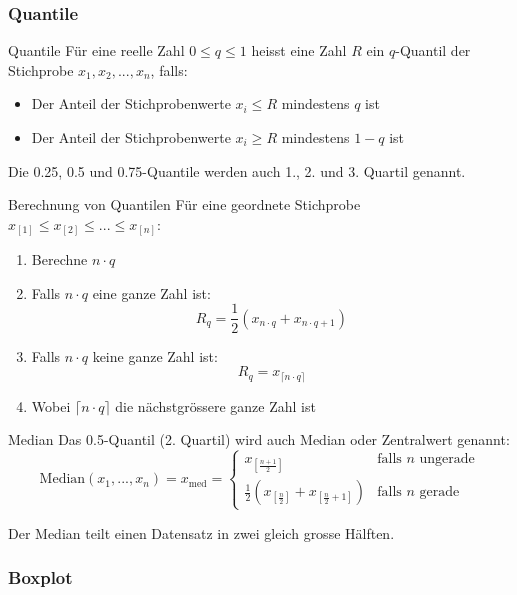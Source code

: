 \subsubsection{Quantile}

\begin{definition}{Quantile}
Für eine reelle Zahl $0 \leq q \leq 1$ heisst eine Zahl $R$ ein $q$-Quantil der Stichprobe $x_1, x_2, ..., x_n$, falls:
\begin{itemize}
    \item Der Anteil der Stichprobenwerte $x_i \leq R$ mindestens $q$ ist
    \item Der Anteil der Stichprobenwerte $x_i \geq R$ mindestens $1-q$ ist
\end{itemize}

Die 0.25, 0.5 und 0.75-Quantile werden auch 1., 2. und 3. Quartil genannt.
\end{definition}

\begin{KR}{Berechnung von Quantilen}
Für eine geordnete Stichprobe $x_{[1]} \leq x_{[2]} \leq ... \leq x_{[n]}$:
\begin{enumerate}
    \item Berechne $n \cdot q$
    \item Falls $n \cdot q$ eine ganze Zahl ist:
        $$R_q = \frac{1}{2}(x_{n\cdot q} + x_{n\cdot q+1})$$
    \item Falls $n \cdot q$ keine ganze Zahl ist:
        $$R_q = x_{\lceil n\cdot q \rceil}$$
    \item Wobei $\lceil n\cdot q \rceil$ die nächstgrössere ganze Zahl ist
\end{enumerate}
\end{KR}

\begin{concept}{Median}
Das 0.5-Quantil (2. Quartil) wird auch Median oder Zentralwert genannt:
$$\text{Median}(x_1,...,x_n) = x_{\text{med}} = \begin{cases}
x_{[\frac{n+1}{2}]} & \text{falls } n \text{ ungerade}\\
\frac{1}{2}(x_{[\frac{n}{2}]} + x_{[\frac{n}{2}+1]}) & \text{falls } n \text{ gerade}
\end{cases}$$

Der Median teilt einen Datensatz in zwei gleich grosse Hälften.
\end{concept}

\subsubsection{Boxplot}

